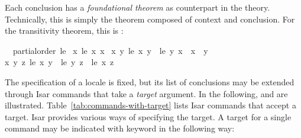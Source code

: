 \begin{isabellebody}
\begin{isamarkuptext}
  Each conclusion has a \emph{foundational theorem} as counterpart
  in the theory.  Technically, this is simply the theorem composed
  of context and conclusion.  For the transitivity theorem, this is
  :
  \begin{isabelle}%
\ \ partial{\isacharunderscore}order\ {\isacharquery}le\ {\isasymequiv}\isanewline
\isaindent{\ \ }{\isacharparenleft}{\isasymforall}x{\isachardot}\ {\isacharquery}le\ x\ x{\isacharparenright}\ {\isasymand}\isanewline
\isaindent{\ \ }{\isacharparenleft}{\isasymforall}x\ y{\isachardot}\ {\isacharquery}le\ x\ y\ {\isasymlongrightarrow}\ {\isacharquery}le\ y\ x\ {\isasymlongrightarrow}\ x\ {\isacharequal}\ y{\isacharparenright}\ {\isasymand}\isanewline
\isaindent{\ \ }{\isacharparenleft}{\isasymforall}x\ y\ z{\isachardot}\ {\isacharquery}le\ x\ y\ {\isasymlongrightarrow}\ {\isacharquery}le\ y\ z\ {\isasymlongrightarrow}\ {\isacharquery}le\ x\ z{\isacharparenright}%
\end{isabelle}%
\end{isamarkuptext}%
\isamarkuptrue%
%
\isamarkuptrue%
%
\begin{isamarkuptext}%
The specification of a locale is fixed, but its list of conclusions
  may be extended through Isar commands that take a \emph{target} argument.
  In the following,  and 
   are illustrated.
  Table~\ref{tab:commands-with-target} lists Isar commands that accept
  a target.  Isar provides various ways of specifying the target.  A
  target for a single command may be indicated with keyword
   in the following way:


\end{isamarkuptext}
\end{isabellebody}
